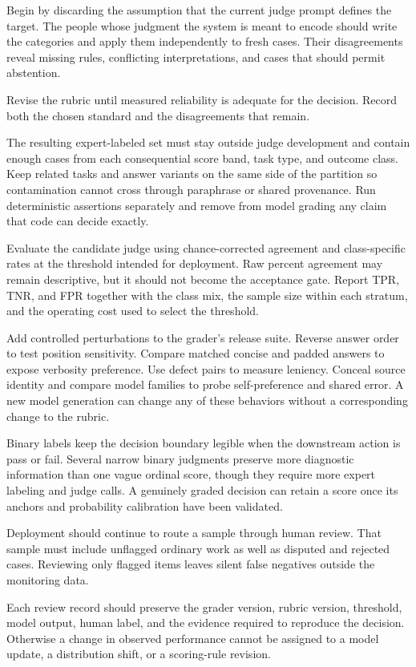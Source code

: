Begin by discarding the assumption that the current judge prompt defines the target. The people whose judgment the system is meant to encode should write the categories and apply them independently to fresh cases. Their disagreements reveal missing rules, conflicting interpretations, and cases that should permit abstention.

Revise the rubric until measured reliability is adequate for the decision. Record both the chosen standard and the disagreements that remain.

The resulting expert-labeled set must stay outside judge development and contain enough cases from each consequential score band, task type, and outcome class. Keep related tasks and answer variants on the same side of the partition so contamination cannot cross through paraphrase or shared provenance. Run deterministic assertions separately and remove from model grading any claim that code can decide exactly.

Evaluate the candidate judge using chance-corrected agreement and class-specific rates at the threshold intended for deployment. Raw percent agreement may remain descriptive, but it should not become the acceptance gate. Report TPR, TNR, and FPR together with the class mix, the sample size within each stratum, and the operating cost used to select the threshold.

Add controlled perturbations to the grader's release suite. Reverse answer order to test position sensitivity. Compare matched concise and padded answers to expose verbosity preference. Use defect pairs to measure leniency. Conceal source identity and compare model families to probe self-preference and shared error. A new model generation can change any of these behaviors without a corresponding change to the rubric.

Binary labels keep the decision boundary legible when the downstream action is pass or fail. Several narrow binary judgments preserve more diagnostic information than one vague ordinal score, though they require more expert labeling and judge calls. A genuinely graded decision can retain a score once its anchors and probability calibration have been validated.

Deployment should continue to route a sample through human review. That sample must include unflagged ordinary work as well as disputed and rejected cases. Reviewing only flagged items leaves silent false negatives outside the monitoring data.

Each review record should preserve the grader version, rubric version, threshold, model output, human label, and the evidence required to reproduce the decision. Otherwise a change in observed performance cannot be assigned to a model update, a distribution shift, or a scoring-rule revision.

